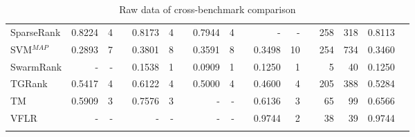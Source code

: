 \documentclass{sig-alternate-2013}
\begin{document}
\begin{longtable}[!hp]{@{}lrrrrrrrrrrrrrrrr@{}}
SparseRank & 0.8224 & 4 && 0.8173 & 4 && 0.7944 & 4 && - & - && 258 & 318 & 0.8113 \\
SVM$^{MAP}$ & 0.2893 & 7 && 0.3801 & 8 && 0.3591 & 8 && 0.3498 & 10 && 254 & 734 & 0.3460 \\
SwarmRank & - & - && 0.1538 & 1 && 0.0909 & 1 && 0.1250 & 1 && 5 & 40 & 0.1250 \\
TGRank & 0.5417 & 4 && 0.6122 & 4 && 0.5000 & 4 && 0.4600 & 4 && 205 & 388 & 0.5284 \\
TM & 0.5909 & 3 && 0.7576 & 3 && - & - && 0.6136 & 3 && 65 & 99 & 0.6566 \\
VFLR & - & - && - & - && - & - && 0.9744 & 2 && 38 & 39 & 0.9744 \\
\bottomrule
\caption{Raw data of cross-benchmark comparison}
\label{tab:raw_data}
\end{longtable}
\end{document}
